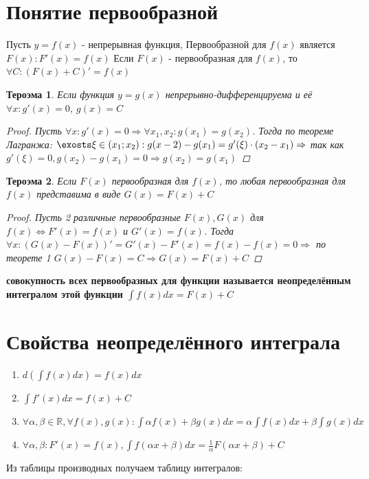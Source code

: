\documentclass[oneside]{book}
\newtheorem{thm}{Тероэма}[chapter] %
\begin{document}
\begin{enumerate}
\begin{itemize}
\begin{enumerate}
\section[Первообразная]{Понятие первообразной}
Пусть $y = f(x)$ - непрерывная функция, Первообразной для $f(x)$ является $F(x): F'(x) = f(x)$
Если $F(x)$ - первообразная для $f(x)$, то $\forall C: (F(x) + C)' = f(x)$
\begin{thm}
  Если функция $y = g(x)$ непрерывно-дифференцируема и её $\forall x: g'(x) = 0$, $g(x) = C$
  \begin{proof}
    Пусть $\forall x: g'(x) = 0 \Rightarrow \forall x_1, x_2: g(x_1) = g(x_2)$. Тогда по теореме Лагранжа:
    $\exosts \xi \in (x_1; x_2): g(x-2) - g(x_1) = g'(\xi)\cdot(x_2 - x_1) \Rightarrow$ так как $g'(\xi) = 0, g(x_2) - g(x_1) = 0 \Rightarrow g(x_2) = g(x_1)$
  \end{proof}
\end{thm}
\begin{thm}
  Если $F(x)$ первообразная для $f(x)$, то любая первообразная для $f(x)$ представима в виде $G(x) = F(x) + C$
  \begin{proof}
    Пусть 2 различные первообразные $F(x), G(x)$ для $f(x) \Leftrightarrow F'(x) = f(x) $ и $G'(x) = f(x)$.
    Тогда $\forall x: (G(x) - F(x))' = G'(x) - F'(x) = f(x) - f(x) = 0 \Rightarrow$ по теорете 1 $G(x) - F(x) = C \Rightarrow G(x) = F(x) + C$
  \end{proof}
\end{thm}
\textbf{совокупность всех первообразных для функции называется неопределённым интегралом этой функции $\int f(x) dx = F(x) + C$}
\section[Свойства]{Свойства неопределённого интеграла}
\begin{enumerate}
  \item $d(\int f(x) dx) = f(x) dx$
  \item $\int f'(x) dx = f(x) + C$
  \item $\forall \alpha, \beta \in \mathbb{R}, \forall f(x), g(x): \int \alpha f(x) + \beta g(x) dx = \alpha \int f(x) dx + \beta \int g(x) dx$
  \item $\forall \alpha, \beta: F'(x) = f(x), \int f(\alpha x + \beta) dx = \frac{1}{\alpha}F(\alpha x+\beta)+C$
\end{enumerate}
Из таблицы производных получаем таблицу интегралов:


\end{enumerate}
\end{itemize}
\end{enumerate}
\end{document}
